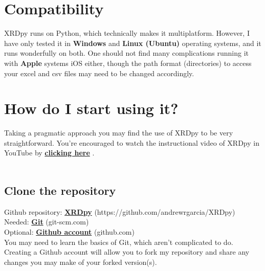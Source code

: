 \documentclass{article}
\begin{document}
\pagebreak

\section{Compatibility} 

XRDpy runs on Python, which technically makes it multiplatform. However, I have only tested it in \textbf{Windows} and \textbf{Linux (Ubuntu)} operating systems, and it runs wonderfully on both. One should not find many complications running it with \textbf{Apple} systems iOS either, though the path format (directories) to access your excel and csv files may need to be changed accordingly. 

\pagebreak
\section{How do I start using it?}

Taking a pragmatic approach you may find the use of XRDpy to be very straightforward. You're encouraged to watch the instructional video of XRDpy in YouTube by \textbf{\href{https://www.youtube.com/watch?v=noYSBvC1IUQ}{clicking here}} .\\\\


\subsection{Clone the repository} 

Github repository: \textcolor{blue(ncs)}{\textbf{\href{https://github.com/andrewrgarcia/XRDpy}{XRDpy}}} \hfill (https://github.com/andrewrgarcia/XRDpy)\\
Needed: \textcolor{blue(ncs)}{\textbf{\href{git-scm.com}{Git}}} \hfill (git-scm.com)\\
Optional: \textcolor{blue(ncs)}{\textbf{\href{github.com}{Github account}}} \hfill (github.com)\\
You may need to learn the basics of Git, which aren't complicated to do. Creating a Github account will allow you to fork my repository and share any changes you may make of your forked version(s). 
\end{document}
